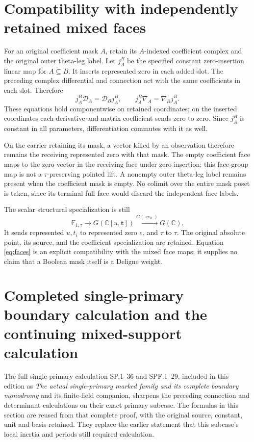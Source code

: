 \documentclass[11pt]{article}
\newcommand{\C}{\mathbb C}
\begin{document}
\section{Compatibility with independently retained mixed faces}

For an original coefficient mask $A$, retain its $A$-indexed coefficient
complex and the original outer theta-leg label.  Let
$j_A^B$ be the specified constant zero-insertion linear map for
$A\subseteq B$.  It inserts represented zero in each added slot.
The preceding complex differential and connection act with the same
coefficients in each slot.  Therefore
\begin{equation}
 j_A^B\mathcal D_A=\mathcal D_Bj_A^B,
 \qquad j_A^B\nabla_A=\nabla_Bj_A^B.
 \label{eq:faces}
\end{equation}
These equations hold componentwise on retained coordinates; on the
inserted coordinates each derivative and matrix coefficient sends zero
to zero.  Since $j_A^B$ is constant in all parameters, differentiation
commutes with it as well.

On the carrier retaining its mask, a vector killed by an observation
therefore remains the receiving represented zero with that mask.
The empty coefficient face maps to the zero vector in the receiving
face under zero insertion; this face-group map is not a
$\tau$-preserving pointed lift.  A nonempty outer theta-leg label
remains present when the coefficient mask is empty.  No colimit over
the entire mask poset is taken, since its terminal full face would
discard the independent face labels.

The scalar structural specialization is still
\[
 \mathbb F_{1,\tau}\longrightarrow G(\C[u,\mathbf t])
       \xrightarrow{G(\operatorname{ev}_0)}G(\C).
\]
It sends represented $u,t_i$ to represented zero $e$, and $\tau$ to
$\tau$.  The original absolute point, its source, and the coefficient
specialization are retained.  Equation \eqref{eq:faces} is an explicit
compatibility with the mixed face maps; it supplies no claim that a
Boolean mask itself is a Deligne weight.

\section{Completed single-primary boundary calculation and the continuing mixed-support calculation}
\label{sec:bc-single-primary-update}

The full single-primary calculation SP.1--36 and SPF.1--29,
included in this edition as
\emph{The actual single-primary marked family and its complete boundary
monodromy} and its finite-field companion, sharpens the preceding
connection and determinant calculations on their exact primary
subcase.  The formulas in this section are reused from that complete
proof, with the original source, constant, unit and basis retained.
They replace the earlier statement that this subcase's local inertia
and periods still required calculation.
\end{document}
